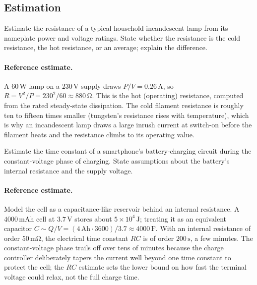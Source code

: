 \subsection*{Estimation}

\begin{exercise}
Estimate the resistance of a typical household incandescent lamp from
its nameplate power and voltage ratings. State whether the resistance
is the cold resistance, the hot resistance, or an average; explain
the difference.
\paragraph{Reference estimate.}
A $60\,\si{\watt}$ lamp on a $230\,\si{\volt}$ supply draws $P/V =
0.26\,\si{\ampere}$, so $R = V^{2}/P = 230^{2}/60 \approx 880\,\si{
\ohm}$. This is the hot (operating) resistance, computed from the
rated steady-state dissipation. The cold filament resistance is roughly
ten to fifteen times smaller (tungsten's resistance rises with
temperature), which is why an incandescent lamp draws a large inrush
current at switch-on before the filament heats and the resistance
climbs to its operating value.
\end{exercise}

\begin{exercise}
Estimate the time constant of a smartphone's battery-charging circuit
during the constant-voltage phase of charging. State assumptions about
the battery's internal resistance and the supply voltage.
\paragraph{Reference estimate.}
Model the cell as a capacitance-like reservoir behind an internal
resistance. A $4000\,\si{\milli\ampere\hour}$ cell at $3.7\,\si{\volt}$
stores about $5\times 10^{4}\,\si{\joule}$; treating it as an
equivalent capacitor $C \sim Q/V = (4\,\text{Ah}\cdot 3600)/3.7
\approx 4000\,\si{\farad}$. With an internal resistance of order
$50\,\si{\milli\ohm}$, the electrical time constant $RC$ is of order
$200\,\si{\second}$, a few minutes. The constant-voltage phase trails
off over tens of minutes because the charge controller deliberately
tapers the current well beyond one time constant to protect the cell;
the $RC$ estimate sets the lower bound on how fast the terminal voltage
could relax, not the full charge time.
\end{exercise}

